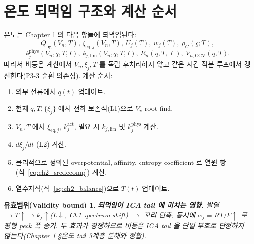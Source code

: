 \documentclass[11pt,a4paper]{article}
\newtheorem*{boundbox}{유효범위(Validity bound)}
\newcommand{\eq}{\mathrm{eq}}
\newcommand{\bg}{\mathrm{bg}}
\newcommand{\OCV}{\mathrm{OCV}}
\begin{document}
\section{온도 되먹임 구조와 계산 순서}\label{sec:ch2_feedback}
온도는 Chapter 1 의 다음 항들에 되먹임된다:
\begin{equation}
Q_\bg(V_n,T),\ \xi_{\eq,j}(V_n,T),\ U_j(T),\ w_j(T),\ \rho_G(g;T),
\end{equation}
\begin{equation}
k_j^{\mathrm{phys}}(V_n,q,T,I),\ k_{j,\mathrm{lim}}(V_n,q,T,I),\ R_n(q,T,|I|),\ V_{n,\OCV}(q,T).
\end{equation}
따라서 비등온 계산에서 $V_n,\xi_j,T$ 를 독립 후처리하지 않고 같은 시간 적분 루프에서 갱신한다(P3-3 순환
의존성). 계산 순서:
\begin{enumerate}[label=\arabic*),leftmargin=2.0em]
\item 외부 전류에서 $q(t)$ 업데이트.
\item 현재 $q,T,\{\xi_j\}$ 에서 전하 보존식(L1)으로 $V_n$ root-find.
\item $V_n,T$ 에서 $\xi_{\eq,j}$, $k_j^{\mathrm{act}}$, 필요 시 $k_{j,\mathrm{lim}}$ 및 $k_j^{\mathrm{phys}}$ 계산.
\item $d\xi_j/dt$ (L2) 계산.
\item 물리적으로 정의된 overpotential, affinity, entropy coefficient 로 열원 항(식~\eqref{eq:ch2_srcdecomp}) 계산.
\item 열수지식(식~\eqref{eq:ch2_balance})으로 $T(t)$ 업데이트.
\end{enumerate}
\begin{boundbox}
\textbf{되먹임이 ICA tail 에 미치는 영향.} 발열 $\to T\uparrow\to k_j\uparrow$($L\downarrow$, Ch1 spectrum
shift) $\to$ 꼬리 단축; 동시에 $w_j=RT/F\uparrow$ 로 평형 peak 폭 증가. 두 효과가 경쟁하므로 비등온 ICA
tail 을 단일 부호로 단정하지 않는다(Chapter 1 \S 온도 tail 3계층 분해와 정합).
\end{boundbox}

\end{document}
